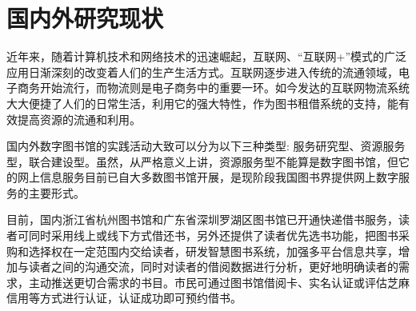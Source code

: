 \section{国内外研究现状}
近年来，随着计算机技术和网络技术的迅速崛起，互联网、“互联网+”模式的广泛应用日渐深刻的改变着人们的生产生活方式。互联网逐步进入传统的流通领域，电子商务开始流行，而物流则是电子商务中的重要一环。如今发达的互联网物流系统大大便捷了人们的日常生活，利用它的强大特性，作为图书租借系统的支持，能有效提高资源的流通和利用。

​国内外数字图书馆的实践活动大致可以分为以下三种类型: 服务研究型、资源服务型，联合建设型。虽然，从严格意义上讲，资源服务型不能算是数字图书馆，但它的网上信息服务目前已自大多数图书馆开展，是现阶段我国图书界提供网上数字服务的主要形式。

​目前，国内浙江省杭州图书馆和广东省深圳罗湖区图书馆已开通快递借书服务，读者可同时采用线上或线下方式借还书，另外还提供了读者优先选书功能，把图书采购和选择权在一定范围内交给读者，研发智慧图书系统，加强多平台信息共享，增加与读者之间的沟通交流，同时对读者的借阅数据进行分析，更好地明确读者的需求，主动推送更切合需求的书目。市民可通过图书馆借阅卡、实名认证或评估芝麻信用等方式进行认证，认证成功即可预约借书。

